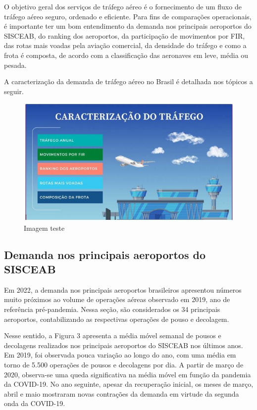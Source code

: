 \documentclass[
]{book}
\begin{document}
O objetivo geral dos serviços de tráfego aéreo é o fornecimento de um fluxo de tráfego aéreo seguro, ordenado e eficiente. Para fins de comparações operacionais, é importante ter um bom entendimento da demanda nos principais aeroportos do SISCEAB, do ranking dos aeroportos, da participação de movimentos por FIR, das rotas mais voadas pela aviação comercial, da densidade do tráfego e como a frota é composta, de acordo com a classificação das aeronaves em leve, média ou pesada.

A caracterização da demanda de tráfego aéreo no Brasil é detalhada nos tópicos a seguir.

\begin{figure}
\centering
\includegraphics{imagens/fig12.jpg}
\caption{Imagem teste}
\end{figure}

\hypertarget{demanda-nos-principais-aeroportos-do-sisceab}{%
\subsection{Demanda nos principais aeroportos do SISCEAB}\label{demanda-nos-principais-aeroportos-do-sisceab}}

Em 2022, a demanda nos principais aeroportos brasileiros apresentou números muito próximos ao volume de operações aéreas observado em 2019, ano de referência pré-pandemia. Nessa seção, são considerados os 34 principais aeroportos, contabilizando as respectivas operações de pouso e decolagem.

Nesse sentido, a Figura 3 apresenta a média móvel semanal de pousos e decolagens realizados nos principais aeroportos do SISCEAB nos últimos anos. Em 2019, foi observada pouca variação ao longo do ano, com uma média em torno de 5.500 operações de pousos e decolagens por dia. A partir de março de 2020, observa-se uma queda significativa na média móvel em função da pandemia da COVID-19. No ano seguinte, apesar da recuperação inicial, os meses de março, abril e maio mostraram novas contrações da demanda em virtude da segunda onda da COVID-19.
\end{document}
